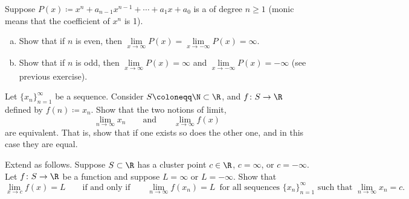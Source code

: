 \begin{exercise}
Suppose $P(x) \coloneqq x^n + a_{n-1} x^{n-1} + \cdots + a_1 x + a_0$ is a \emph{}
of degree $n \geq 1$ (monic means that the coefficient of $x^n$ is 1).
\begin{enumerate}[a)]
\item
Show that if $n$ is even, then $\lim\limits_{x\to\infty} P(x) = 
\lim\limits_{x\to-\infty} P(x) = \infty$.
\item
Show that if $n$ is odd, then
$\lim\limits_{x\to\infty} P(x) = \infty$ and
$\lim\limits_{x\to-\infty} P(x) = -\infty$ (see previous exercise).
\end{enumerate}
\end{exercise}

\begin{exercise}
Let $\{ x_n \}_{n=1}^\infty$ be a sequence.  Consider $S \coloneqq \N \subset \R$, and
$f \colon S \to \R$ defined by $f(n) \coloneqq x_n$.  Show that
the two notions of limit,
\begin{equation*}
\lim_{n\to\infty} x_n \qquad \text{and} \qquad
\lim_{x\to\infty} f(x) 
\end{equation*}
are equivalent.  That is, show that if one exists so does
the other one, and in this case they are equal.
\end{exercise}

\begin{exercise}
Extend  as follows.
Suppose $S \subset \R$ has a cluster point $c \in \R$, $c = \infty$,
or $c = -\infty$.  Let $f \colon S \to \R$ be a function and suppose
$L = \infty$ or $L = -\infty$.  Show that
\begin{equation*}
\lim_{x\to c} f(x) = L
\qquad \text{if and only if}
\qquad
\lim_{n\to\infty} f(x_n) = L \enspace \text{for all sequences }
\{ x_n \}_{n=1}^\infty \text{ such that } \lim_{n\to\infty} x_n = c .
\end{equation*}
\end{exercise}

